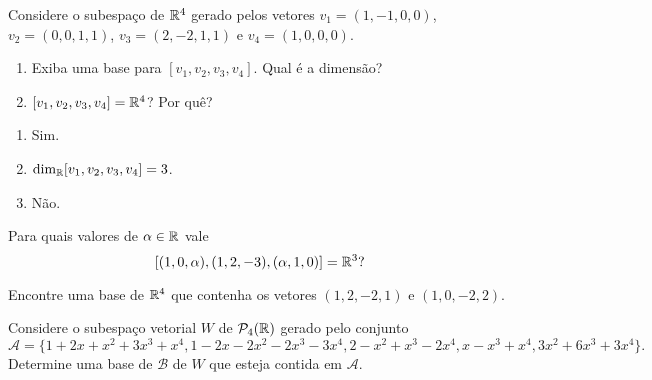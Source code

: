 \documentclass[12pt]{exam}
\begin{document}
    \begin{exercicio}
        Considere o subespa\c{c}o de $\mathbb{R}^4$ gerado pelos vetores $v_1 = (1, -1, 0, 0)$, $v_2 = (0, 0, 1, 1)$, $v_3 = (2, -2, 1, 1)$ e $v_4 = (1, 0, 0, 0)$.
        \begin{enumerate}[label={\alph*})]
            \item Exiba uma base para $[v_1, v_2, v_3, v_4]$. Qual \'e a dimens\~ao?

            \item $[v_1, v_2, v_3, v_4] = \mathbb{R}^4$? Por qu\^e?
        \end{enumerate}
        \begin{solucao}
            \begin{enumerate}[label={\alph*})]
                \item Sim.

                \item $\dim_{\mathbb{R}} [v_1, v_2, v_3, v_4] = 3$.

                \item N\~ao.
            \end{enumerate}
        \end{solucao}
    \end{exercicio}

    \begin{exercicio}
        Para quais valores de $\alpha \in \mathbb{R}$ vale
        \[
            [(1, 0, \alpha), (1, 2, -3) , (\alpha, 1, 0)] = \mathbb{R}^3?
        \]
    \end{exercicio}

    \begin{exercicio}
        Encontre uma base de $\mathbb{R}^4$ que contenha os vetores $(1,2,-2,1)$ e $(1,0,-2,2)$.
    \end{exercicio}

    \begin{exercicio}
        Considere o subespa\c{c}o vetorial $W$ de $\mathcal{P}_4(\mathbb{R})$ gerado pelo conjunto
        \[
            \mathcal{A} = \{1+2x+x^2+3x^3+x^4, 1-2x-2x^2-2x^3-3x^4,2-x^2+x^3-2x^4,x-x^3+x^4,3x^2+6x^3+3x^4\}.
        \]
        Determine uma base de $\mathcal{B}$ de $W$ que esteja contida em $\mathcal{A}$.
    \end{exercicio}
\end{document}
